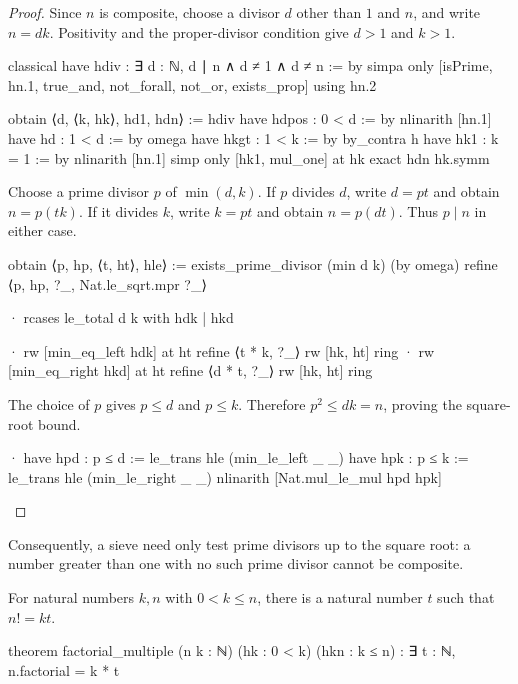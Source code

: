 \begin{proof}
  Since $n$ is composite, choose a divisor $d$ other than $1$ and $n$, and write $n=dk$.
  Positivity and the proper-divisor condition give $d>1$ and $k>1$.

  \begin{lean}
    classical
    have hdiv : ∃ d : ℕ, d ∣ n ∧ d ≠ 1 ∧ d ≠ n := by
      simpa only [isPrime, hn.1, true_and, not_forall, not_or, exists_prop] using hn.2

    obtain ⟨d, ⟨k, hk⟩, hd1, hdn⟩ := hdiv
    have hdpos : 0 < d := by
      nlinarith [hn.1]
    have hd : 1 < d := by
      omega
    have hkgt : 1 < k := by
      by_contra h
      have hk1 : k = 1 := by
        nlinarith [hn.1]
      simp only [hk1, mul_one] at hk
      exact hdn hk.symm
  \end{lean}

  Choose a prime divisor $p$ of $\min(d,k)$.
  If $p$ divides $d$, write $d=pt$ and obtain $n=p(tk)$.
  If it divides $k$, write $k=pt$ and obtain $n=p(dt)$.
  Thus $p\mid n$ in either case.

  \begin{lean}
    obtain ⟨p, hp, ⟨t, ht⟩, hle⟩ := exists_prime_divisor (min d k) (by omega)
    refine ⟨p, hp, ?_, Nat.le_sqrt.mpr ?_⟩

    · rcases le_total d k with hdk | hkd

      · rw [min_eq_left hdk] at ht
        refine ⟨t * k, ?_⟩
        rw [hk, ht]
        ring
      · rw [min_eq_right hkd] at ht
        refine ⟨d * t, ?_⟩
        rw [hk, ht]
        ring
  \end{lean}

  The choice of $p$ gives $p\le d$ and $p\le k$.
  Therefore $p^2\le dk=n$, proving the square-root bound.

  \begin{lean}
    · have hpd : p ≤ d := le_trans hle (min_le_left _ _)
      have hpk : p ≤ k := le_trans hle (min_le_right _ _)
      nlinarith [Nat.mul_le_mul hpd hpk]
  \end{lean}

\end{proof}

Consequently, a sieve need only test prime divisors up to the square root: a number greater than
one with no such prime divisor cannot be composite.

\begin{lemma}
  \label{ent:lem:factorial-multiple}
  For natural numbers $k,n$ with $0<k\le n$, there is a natural number $t$ such that $n!
    =kt$.

  \begin{lean}
    theorem factorial_multiple (n k : ℕ) (hk : 0 < k) (hkn : k ≤ n) :
        ∃ t : ℕ, n.factorial = k * t
  \end{lean}
\end{lemma}

